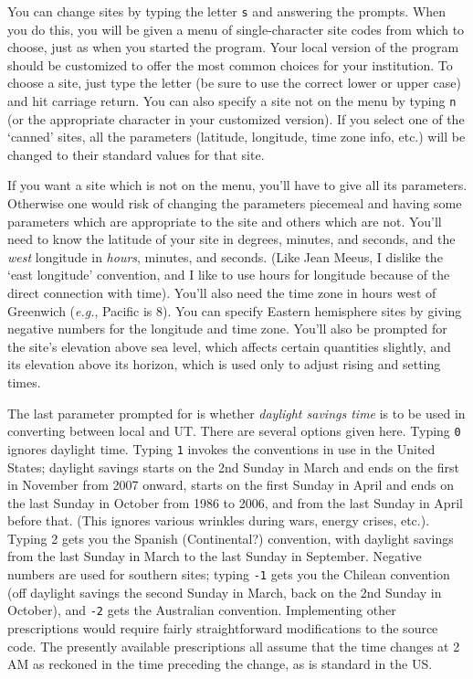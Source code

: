 You can change sites by typing the letter {\tt s} and answering the prompts.
When you do this, you will be given a menu of single-character 
site codes from which to choose, just as when you started the program.
Your local version
of the program should be customized to offer the most
common choices for your institution.  To choose a site, just
type the letter (be sure to use the correct lower or upper
case) and hit carriage return.  You can also specify 
a site not on the menu by typing {\tt n} (or the appropriate character
in your customized version).
If you select one of the `canned' sites, all the parameters
(latitude, longitude, time zone info, etc.) will be changed to
their standard values for that site.
\par
If you want a site which is not on the menu, you'll have to give
all its parameters.  Otherwise one would risk of changing 
the parameters piecemeal and having some parameters which are appropriate
to the site and others which are not.  You'll need to know the 
latitude of your site in degrees, minutes, and seconds, 
and the {\it west} longitude in {\it hours}, minutes, and seconds.
(Like Jean Meeus, I dislike the `east longitude' convention, and I
like to use hours for longitude because of the direct connection
with time).
You'll also need the time zone in hours west of Greenwich ({\it e.g.},
Pacific is 8).  You can specify Eastern hemisphere sites by giving
negative numbers for the longitude and time zone.  You'll also be
prompted for the site's elevation above sea level, which 
affects certain quantities slightly, and its
elevation above its horizon, which is used only
to adjust rising and setting times.
\par
The last parameter prompted for is whether {\it daylight
savings time} is to be used in converting between local and UT.  There
are several options given here.  Typing {\tt 0} ignores daylight
time.  Typing {\tt 1} invokes the conventions in use in the
United States; daylight savings starts on the 
2nd Sunday in March and ends on the first in November from 2007 onward,
starts on the first
Sunday in April and ends on the last Sunday in October from 1986 to 2006,
and from the last Sunday in April before that.  (This ignores
various wrinkles during wars, energy crises, etc.).  Typing 2 gets
you the Spanish (Continental?) convention, with daylight
savings from the last Sunday in March to the last Sunday
in September.  Negative numbers are used for southern sites; 
typing {\tt -1} gets you the Chilean convention
(off daylight savings the second Sunday in March, back
on the 2nd Sunday in October), and {\tt -2} gets the
Australian convention.  Implementing other prescriptions would require 
fairly straightforward modifications
to the source code.  The presently available prescriptions all assume
that the time changes at 2 AM as reckoned in the time preceding the
change, as is standard in the US.

